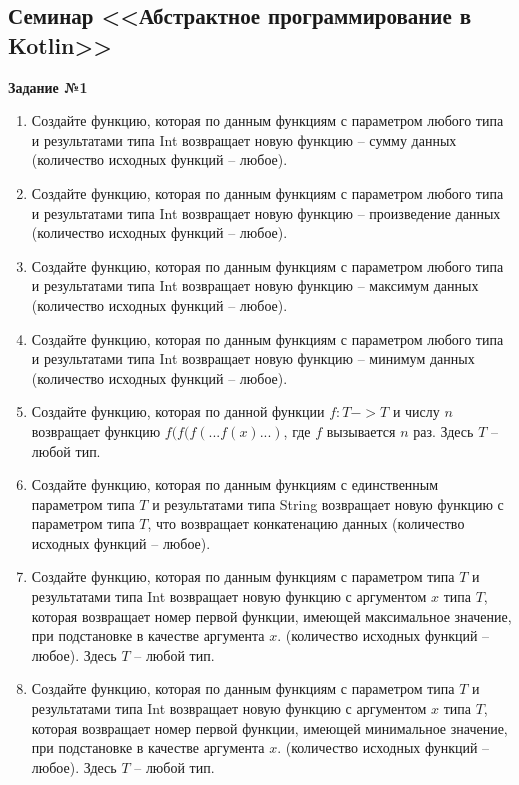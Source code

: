 \subsection{Семинар <<Абстрактное программирование в Kotlin>>}

\textbf{Задание №1}

\begin{enumerate}
	\item Создайте функцию, которая по данным функциям с параметром любого типа и результатами типа Int возвращает новую функцию -- сумму данных 
		(количество исходных функций -- любое).
	\item Создайте функцию, которая по данным функциям с параметром любого типа и результатами типа Int возвращает новую функцию -- произведение данных
		(количество исходных функций -- любое).
	\item Создайте функцию, которая по данным функциям с параметром любого типа и результатами типа Int возвращает новую функцию -- максимум данных
		(количество исходных функций -- любое).
  	\item Создайте функцию, которая по данным функциям с параметром любого типа и результатами типа Int возвращает новую функцию -- минимум данных
		(количество исходных функций -- любое).
	\item Создайте функцию, которая по данной функции $f:T->T$ и числу $n$ возвращает функцию $f(f(f(...f(x)...)$, где $f$ вызывается $n$ раз. Здесь $T$ -- любой тип.
  	\item Создайте функцию, которая по данным функциям с единственным параметром типа $T$ и результатами типа String возвращает 
		новую функцию с параметром типа $T$, что возвращает конкатенацию данных (количество исходных функций -- любое).
	\item Создайте функцию, которая по данным функциям с параметром типа $T$ и результатами типа Int возвращает новую функцию с аргументом $x$ типа $T$,
		которая возвращает номер первой функции, имеющей максимальное значение, при подстановке в качестве аргумента $x$.
		(количество исходных функций -- любое). Здесь $T$ -- любой тип.
	\item Создайте функцию, которая по данным функциям с параметром типа $T$ и результатами типа Int возвращает новую функцию с аргументом $x$ типа $T$,
		которая возвращает номер первой функции, имеющей минимальное значение, при подстановке в качестве аргумента $x$.
		(количество исходных функций -- любое). Здесь $T$ -- любой тип.


\end{enumerate}
